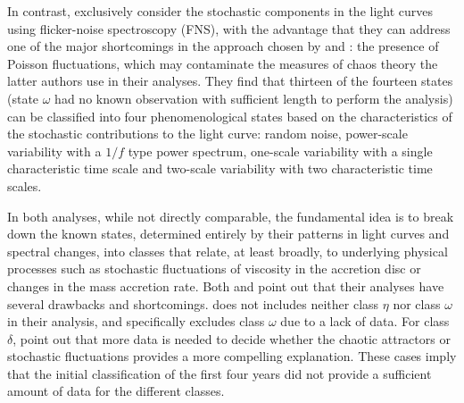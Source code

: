 \documentclass[12pt]{emulateapj}
\begin{document}
In contrast, \citet{polyakov2012} exclusively consider the stochastic components in the light curves using 
flicker-noise spectroscopy (FNS), with the advantage that they can address one of the major shortcomings in the approach chosen by \citet{misra2004,misra2006} and 
\citet{harikrishnan2011}: the presence of Poisson fluctuations, which may contaminate the measures of chaos theory the latter authors use in their analyses.
They find that thirteen of the fourteen states (state $\omega$ had no known observation with sufficient length to perform the analysis) can be classified into 
four phenomenological states based on the characteristics of the stochastic contributions to the light curve: random noise, power-scale variability with a $1/f$ type 
power spectrum, one-scale variability with a single characteristic time scale and two-scale variability with two characteristic time scales. 

In both analyses, while not directly comparable, the fundamental idea is to break down the known states, determined entirely by their patterns in light curves and 
spectral changes, into classes that relate, at least broadly, to underlying physical processes such as stochastic fluctuations of viscosity in the accretion disc or 
changes in the mass accretion rate. Both \citet{harikrishnan2011} and \citet{polyakov2012} point out that their analyses have several drawbacks and shortcomings. 
\citet{harikrishnan2011} does not includes neither class $\eta$ nor class $\omega$ in their analysis, and \citet{polyakov2012} specifically excludes class $\omega$ due to 
a lack of data. For class $\delta$, \citet{polyakov2012} point out that more data is needed to decide whether the chaotic attractors or stochastic fluctuations 
provides a more compelling explanation. These cases imply that the initial classification of the first four years did not provide a sufficient amount of data for the 
different classes.
\end{document}
